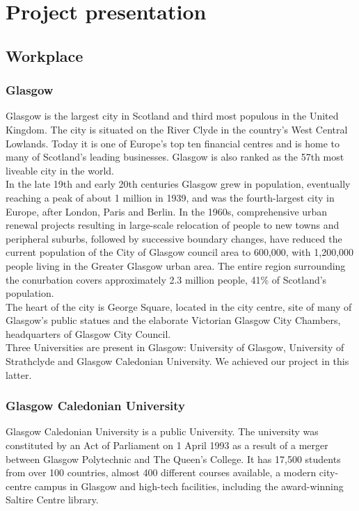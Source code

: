 \documentclass{scrreprt}
\begin{document}
		  \renewcommand{\contentsname}{Summary}
		  \tableofcontents

		  \part{Project presentation}
		  \chapter{Workplace}
		  \section{Glasgow}%
		  Glasgow is the largest city in Scotland and third most populous in the United
		  Kingdom. The city is situated on the River Clyde in the country's West Central Lowlands.
		  Today it is one of Europe's top ten financial centres and is home to many of
		  Scotland's leading businesses. Glasgow is also ranked as the 57th most liveable city in the
		  world.\\

		  In the late 19th and early 20th centuries Glasgow grew in population, eventually
		  reaching a peak of about 1 million in 1939, and was the fourth-largest city in Europe, after
		  London, Paris and Berlin. In the 1960s, comprehensive urban renewal projects resulting in
		  large-scale relocation of people to new towns and peripheral suburbs, followed by
		  successive boundary changes, have reduced the current population of the City of Glasgow
		  council area to 600,000, with 1,200,000 people living in the Greater Glasgow urban area. The
		  entire region surrounding the conurbation covers approximately 2.3 million people, 41\% of
		  Scotland's population.\\

		  The heart of the city is George Square, located in the city centre, site of many of
		  Glasgow's public statues and the elaborate Victorian Glasgow City Chambers, headquarters
		  of Glasgow City Council.\\

		  Three Universities are present in Glasgow: University of Glasgow, University of
		  Strathclyde and Glasgow Caledonian University. We achieved our project in this latter.

		  \section{Glasgow Caledonian University}%
		  Glasgow Caledonian University is a public University. The university was constituted
		  by an Act of Parliament on 1 April 1993 as a result of a merger between Glasgow Polytechnic
		  and The Queen's College. It has 17,500 students from over 100 countries, almost 400
		  different courses available, a modern city-centre campus in Glasgow and high-tech facilities,
		  including the award-winning Saltire Centre library.
\end{document}
